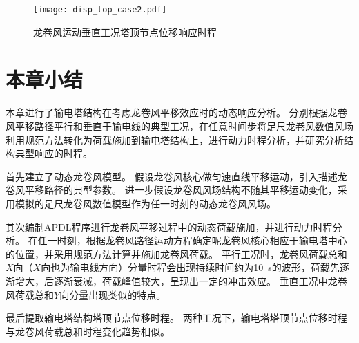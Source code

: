 \begin{figure}[!htpb]
    \centering
    \texttt{[image: disp\_top\_case2.pdf]}
    \caption{龙卷风运动垂直工况塔顶节点位移响应时程}
    \label{fig:disp_top_case2}
\end{figure}

\section{本章小结}
本章进行了输电塔结构在考虑龙卷风平移效应时的动态响应分析。
分别根据龙卷风平移路径平行和垂直于输电线的典型工况，在任意时间步将足尺龙卷风数值风场利用规范方法转化为荷载施加到输电塔结构上，进行动力时程分析，并研究分析结构典型响应的时程。

首先建立了动态龙卷风模型。
假设龙卷风核心做匀速直线平移运动，引入描述龙卷风平移路径的典型参数。
进一步假设龙卷风风场结构不随其平移运动变化，采用模拟的足尺龙卷风数值模型作为任一时刻的动态龙卷风风场。

其次编制APDL程序进行龙卷风平移过程中的动态荷载施加，并进行动力时程分析。
在任一时刻，根据龙卷风路径运动方程确定呢龙卷风核心相应于输电塔中心的位置，并采用规范方法计算并施加龙卷风荷载。
平行工况时，龙卷风荷载总和$X$向（$X$向也为输电线方向）分量时程会出现持续时间约为\SI{10}{s}的波形，荷载先逐渐增大，后逐渐衰减，荷载峰值较大，呈现出一定的冲击效应。
垂直工况中龙卷风荷载总和$Y$向分量出现类似的特点。

最后提取输电塔结构塔顶节点位移时程。
两种工况下，输电塔塔顶节点位移时程与龙卷风荷载总和时程变化趋势相似。

